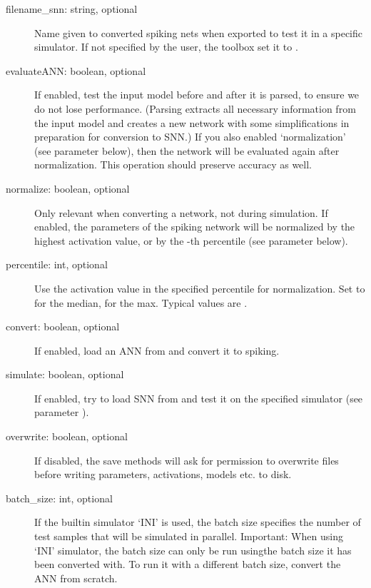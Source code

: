 \documentclass[letterpaper,10pt,english]{sphinxmanual}
\begin{document}
\begin{description}
\item[{filename\_snn: string, optional}] \leavevmode
Name given to converted spiking nets when exported to test it in a specific
simulator. If not specified by the user, the toolbox set it to
.

\item[{evaluateANN: boolean, optional}] \leavevmode
If enabled, test the input model before and after it is parsed, to ensure
we do not lose performance. (Parsing extracts all necessary information
from the input model and creates a new network with some simplifications in
preparation for conversion to SNN.)
If you also enabled `normalization' (see parameter  below),
then the network will be evaluated again after normalization. This
operation should preserve accuracy as well.

\item[{normalize: boolean, optional}] \leavevmode
Only relevant when converting a network, not during simulation. If enabled,
the parameters of the spiking network will be normalized by the highest
activation value, or by the -th percentile (see parameter
 below).

\item[{percentile: int, optional}] \leavevmode
Use the activation value in the specified percentile for normalization.
Set to  for the median,  for the max. Typical values are
.

\item[{convert: boolean, optional}] \leavevmode
If enabled, load an ANN from  and convert it to spiking.

\item[{simulate: boolean, optional}] \leavevmode
If enabled, try to load SNN from  and test it on the specified
simulator (see parameter ).

\item[{overwrite: boolean, optional}] \leavevmode
If disabled, the save methods will ask for permission to overwrite files
before writing parameters, activations, models etc. to disk.

\item[{batch\_size: int, optional}] \leavevmode
If the builtin simulator `INI' is used, the batch size specifies
the number of test samples that will be simulated in parallel. Important:
When using `INI' simulator, the batch size can only be run usingthe batch
size it has been converted with. To run it with a different batch size,
convert the ANN from scratch.


\end{description}
\end{document}
